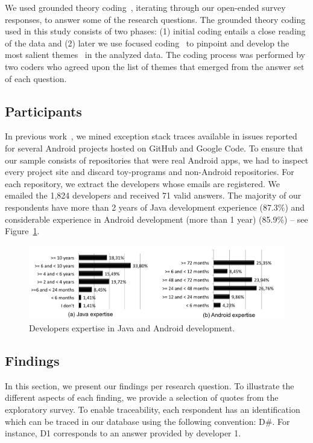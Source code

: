 We used grounded theory coding~\cite{charmaz2006}, iterating through our open-ended survey responses, to answer some of the research questions. The grounded theory coding used in this study consists of two phases: (1) initial coding entails a close reading of the data and (2) later we use focused coding~\cite{charmaz2006} to pinpoint and develop the most salient themes~\cite{charmaz2006} in the analyzed data. The coding process was performed by two coders who agreed upon the list of themes that emerged from the answer set of each question.

\subsection{Participants}

 In previous work~\cite{coelhoetal15}, we mined exception stack traces available in issues reported for several Android projects hosted on GitHub and Google Code. To ensure that our sample consists of repositories that were real Android apps, we had to inspect every project site and discard toy-programs and non-Android repositories. For each repository, we extract the developers whose emails are registered. We emailed the 1,824 developers and received 71 valid answers. The majority of our respondents have more than 2 years of Java development experience (87.3\%) and  considerable experience in Android development (more than 1 year)  (85.9\%) -- see Figure~\ref{fig:devexpertise}.

\begin{figure} \centering \includegraphics[scale=0.38]{expertise_new.png}
\caption{Developers expertise in Java and Android development.}
\label{fig:devexpertise}
\end{figure}

\subsection{Findings}

In this section, we present our findings per research question. 
To illustrate the different aspects of each
finding, we provide a selection of quotes from the exploratory
survey. 
To enable traceability, each respondent has an identification
 which can be traced in our database using the following convention: 
D\#. For instance, D1 corresponds to an answer provided
 by developer 1.


